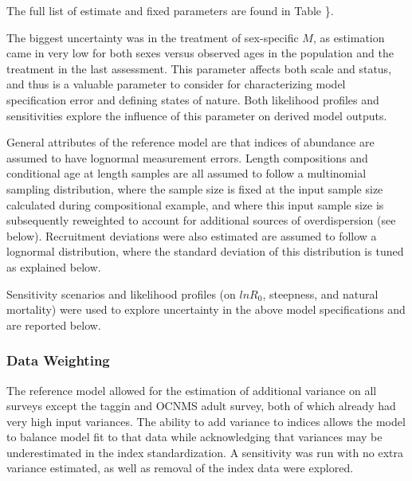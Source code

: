 \documentclass[
]{scrartcl}
\begin{document}
The full list of estimate and fixed parameters are found in Table \}.

The biggest uncertainty was in the treatment of sex-specific \(M\), as
estimation came in very low for both sexes versus observed ages in the
population and the treatment in the last assessment. This parameter
affects both scale and status, and thus is a valuable parameter to
consider for characterizing model specification error and defining
states of nature. Both likelihood profiles and sensitivities explore the
influence of this parameter on derived model outputs.

General attributes of the reference model are that indices of abundance
are assumed to have lognormal measurement errors. Length compositions
and conditional age at length samples are all assumed to follow a
multinomial sampling distribution, where the sample size is fixed at the
input sample size calculated during compositional example, and where
this input sample size is subsequently reweighted to account for
additional sources of overdispersion (see below). Recruitment deviations
were also estimated are assumed to follow a lognormal distribution,
where the standard deviation of this distribution is tuned as explained
below.

Sensitivity scenarios and likelihood profiles (on \(lnR_0\), steepness,
and natural mortality) were used to explore uncertainty in the above
model specifications and are reported below.

\subsubsection{Data Weighting}\label{data-weighting}

The reference model allowed for the estimation of additional variance on
all surveys except the taggin and OCNMS adult survey, both of which
already had very high input variances. The ability to add variance to
indices allows the model to balance model fit to that data while
acknowledging that variances may be underestimated in the index
standardization. A sensitivity was run with no extra variance estimated,
as well as removal of the index data were explored.
\end{document}
